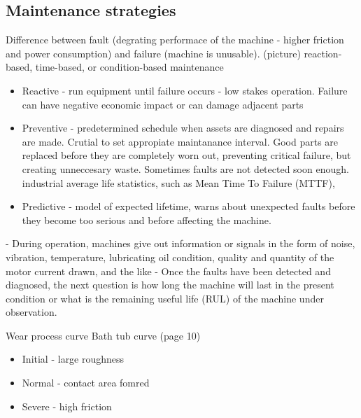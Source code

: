 \subsection{Maintenance strategies}
\cite{mohanty_machinery_2015}
Difference between fault (degrating performace of the machine - higher friction and power consumption) and failure (machine is unusable). (picture)
reaction-based, time-based, or condition-based maintenance
\begin{itemize}
\item Reactive - run equipment until failure occurs - low stakes operation. Failure can have negative economic impact or can damage adjacent parts
\item Preventive - predetermined schedule when assets are diagnosed and repairs are made. Crutial to set appropiate maintanance interval. Good parts are replaced before they are completely worn out, preventing critical failure, but creating unneccesary waste. Sometimes faults are not detected soon enough. industrial average life statistics, such as Mean Time To Failure (MTTF),
\item Predictive - model of expected lifetime, warns about unexpected faults before they become too serious and before affecting the machine.
\end{itemize}

- During operation, machines give out information or signals in the form of noise, vibration, temperature, lubricating oil condition, quality and quantity of the motor current drawn, and the like
- Once the faults have been detected and diagnosed, the next question is how long the machine will last in the present condition or what is the remaining useful life (RUL) of the machine under observation.

Wear process curve Bath tub curve (page 10)
\begin{itemize}
	\item Initial - large roughness
	\item Normal - contact area fomred
	\item Severe - high friction
\end{itemize}

